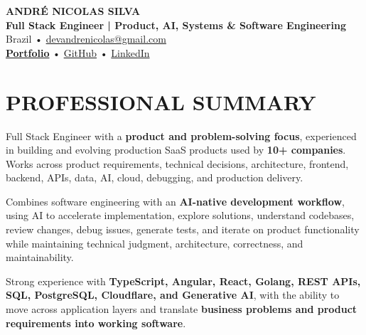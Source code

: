 \documentclass[10pt,a4paper]{article}
\begin{document}

\begin{center}

    {\LARGE \textbf{ANDRÉ NICOLAS SILVA}} \\[-2pt]

    {\normalsize \textbf{Full Stack Engineer | Product, AI, Systems \& Software Engineering}} \\[1pt]

    \footnotesize
    Brazil \quad • \quad
    \href{mailto:devandrenicolas@gmail.com}{devandrenicolas@gmail.com} \\[-1pt]

    \textbf{\href{https://portfolio-andrenicolas.vercel.app}{Portfolio}}
    \quad • \quad
    \href{https://github.com/devAndreNicolas}{GitHub}
    \quad • \quad
    \href{https://www.linkedin.com/in/devandrenicolas}{LinkedIn}

\end{center}

\vspace{-3pt}


\section*{PROFESSIONAL SUMMARY}

\footnotesize

Full Stack Engineer with a \textbf{product and problem-solving focus},
experienced in building and evolving production SaaS products used by
\textbf{10+ companies}. Works across product requirements, technical
decisions, architecture, frontend, backend, APIs, data, AI, cloud,
debugging, and production delivery.

Combines software engineering with an \textbf{AI-native development
workflow}, using AI to accelerate implementation, explore solutions,
understand codebases, review changes, debug issues, generate tests,
and iterate on product functionality while maintaining technical
judgment, architecture, correctness, and maintainability.

Strong experience with \textbf{TypeScript, Angular, React, Golang,
REST APIs, SQL, PostgreSQL, Cloudflare, and Generative AI}, with the
ability to move across application layers and translate
\textbf{business problems and product requirements into working
software}.
\end{document}
